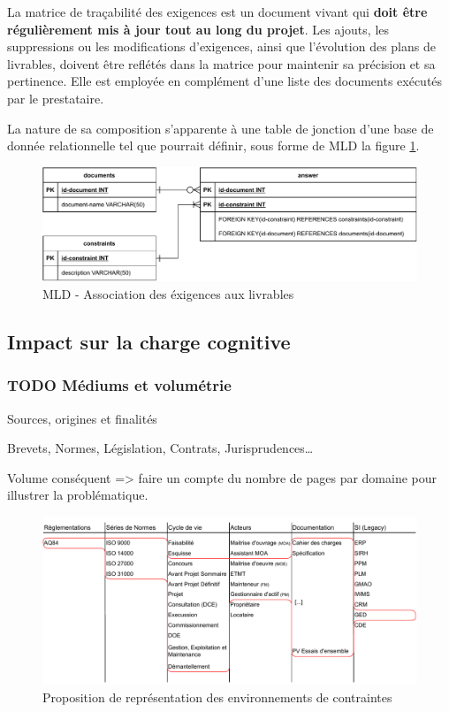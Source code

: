 \documentclass[a4paper,12pt]{article}
\begin{document}
La matrice de traçabilité des exigences est un document vivant qui \textbf{doit être régulièrement mis à jour tout au long du projet}. Les ajouts, les suppressions ou les modifications d'exigences, ainsi que l'évolution des plans de livrables, doivent être reflétés dans la matrice pour maintenir sa précision et sa pertinence.
Elle est employée en complément d'une liste des documents exécutés par le prestataire.

La nature de sa composition s'apparente à une table de jonction d'une base de donnée relationnelle tel que pourrait définir, sous forme de MLD la figure \ref{fig:orgee7ec83}.

\begin{figure}[htbp]
\centering
\includegraphics[width=.9\linewidth]{./svg/db-exigences-lde.pdf}
\caption{\label{fig:orgee7ec83}MLD - Association des éxigences aux livrables}
\end{figure}
\subsection{Impact sur la charge cognitive}
\label{sec:orgd7a8f4b}
\subsubsection{{\bfseries\sffamily TODO} Médiums et volumétrie}
\label{sec:org47f8cc4}
Sources, origines et finalités

Brevets, Normes, Législation, Contrats, Jurisprudences\ldots{}

Volume conséquent => faire un compte du nombre de pages par domaine pour illustrer la problématique.

\begin{figure}[htbp]
\centering
\includegraphics[width=.9\linewidth]{./svg/360-view-engineering-environment.pdf}
\caption{\label{fig:org9c2c7b2}Proposition de représentation des environnements de contraintes}
\end{figure}
\end{document}
